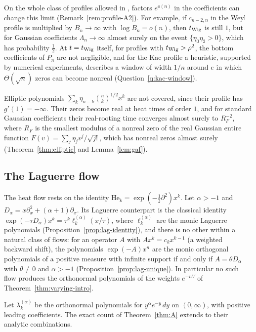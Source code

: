 \documentclass[11pt]{amsart}
\theoremstyle{definition}
\theoremstyle{remark}
\numberwithin{equation}{section}
\newcommand{\He}{\mathrm{He}}
\begin{document}
On the whole class of profiles allowed in \cite{HHJK}, factors $e^{o(n)}$ in the coefficients can change this limit (Remark~\ref{rem:profile-A2}). For example, if $c_{n-2,n}$ in the Weyl profile is multiplied by $B_n\to\infty$ with $\log B_n=o(n)$, then $t_{\rm Wig}$ is still $1$, but for Gaussian coefficients $\Lambda_n\to\infty$ almost surely on the event $\{\eta_0\eta_2>0\}$, which has probability $\frac12$. At $t=t_{\rm Wig}$ itself, for profiles with $t_{\rm Wig}>\rho^2$, the bottom coefficients of $P_n$ are not negligible, and for the Kac profile a heuristic, supported by numerical experiments, describes a window of width $1/n$ around $e$ in which $\Theta(\sqrt n)$ zeros can become nonreal (Question~\ref{q:kac-window}).

Elliptic polynomials $\sum_k\eta_{n-k}\binom nk^{1/2}x^k$ are not covered, since their profile has $g'(1)=-\infty$. Their zeros become real at heat times of order $1$, and for standard Gaussian coefficients their real-rooting time converges almost surely to $R_F^{-2}$, where $R_F$ is the smallest modulus of a nonreal zero of the real Gaussian entire function $F(v)=\sum_j\eta_jv^j/\sqrt{j!}$, which has nonreal zeros almost surely (Theorem~\ref{thm:elliptic} and Lemma~\ref{lem:gaf}).

\subsection{The Laguerre flow}
The heat flow rests on the identity $\He_k=\exp(-\frac12\partial^2)x^k$. Let $\alpha>-1$ and $D_\alpha=x\partial_x^2+(\alpha+1)\partial_x$. Its Laguerre counterpart is the classical identity $\exp(-\tau D_\alpha)x^k=\tau^k\ell^{(\alpha)}_k(x/\tau)$, where $\ell^{(\alpha)}_k$ are the monic Laguerre polynomials (Proposition~\ref{prop:lag-identity}), and there is no other within a natural class of flows: for an operator $A$ with $Ax^k=c_kx^{k-1}$ (a weighted backward shift), the polynomials $\exp(-A)x^n$ are the monic orthogonal polynomials of a positive measure with infinite support if and only if $A=\theta D_\alpha$ with $\theta\ne0$ and $\alpha>-1$ (Proposition~\ref{prop:lag-unique}). In particular no such flow produces the orthonormal polynomials of the weights $e^{-nV}$ of Theorem~\ref{thm:varying-intro}.

Let $\lambda^{(\alpha)}_k$ be the orthonormal polynomials for $y^\alpha e^{-y}\,dy$ on $(0,\infty)$, with positive leading coefficients. The exact count of Theorem~\ref{thm:A} extends to their analytic combinations.
\end{document}
